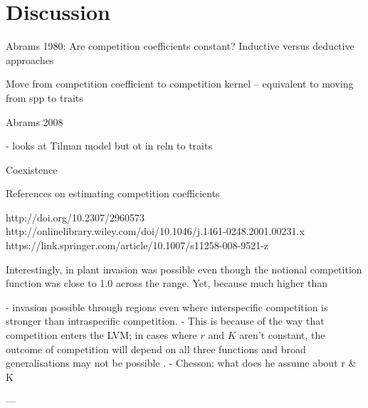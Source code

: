 \documentclass[a4paper,11pt]{article}
\begin{document}
\section{Discussion}

Abrams 1980: Are competition coefficients constant? Inductive versus deductive approaches

Move from competition coefficient to competition kernel -- equivalent to moving from spp to traits



Abrams 2008

- looks at Tilman model but ot in reln to traits


Coexistence
 


References on estimating competition coefficients

http://doi.org/10.2307/2960573
http://onlinelibrary.wiley.com/doi/10.1046/j.1461-0248.2001.00231.x
https://link.springer.com/article/10.1007/s11258-008-9521-z



Interestingly, in plant invasion was possible even though the notional competition function was close to 1.0 across the range. Yet, because much higher than 

- invasion possible through regions even where interspecific competition is stronger than intraspecific competition.
- This is because of the way that competition enters the LVM; in cases where $r$ and $K$ aren't constant, the outcome of competition will depend on all three functions and broad generalisations may not be possible \citep[c.f.][]{Leimar-2013}.
- Chesson: what does he assume about r \& K

---
\end{document}
